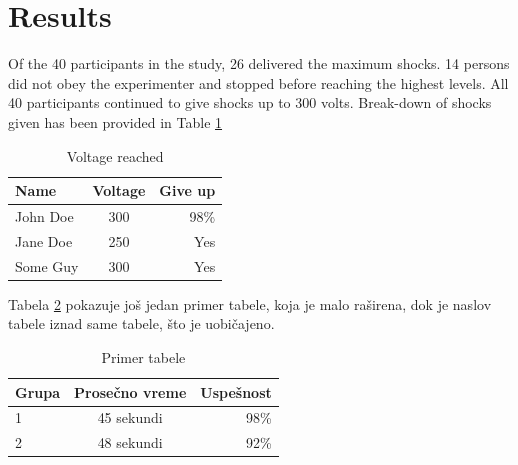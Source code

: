 \documentclass[conference]{IEEEtran}
\begin{document}
\section{Results}
\label{sec_results}

Of the 40 participants in the study, 26 delivered the maximum shocks. 14 persons 
did not obey the experimenter and stopped before reaching the highest levels. All 40 
participants continued to give shocks up to 300 volts. Break-down of shocks given
has been provided in Table \ref{tbl_voltages}

\begin{table}[h]
\centering
\begin{tabular}{ l | c | r }
  Name & Voltage & Give up \\
  \hline %
  John Doe & 300 & 98\% \\ %
  Jane Doe & 250 & Yes \\
  Some Guy & 300 & Yes\\
\end{tabular}
  \caption{Voltage reached}
  \label{tbl_voltages}
\end{table}

\lipsum [1-3] %

Tabela \ref{tabela2} pokazuje još jedan primer tabele, koja je malo raširena, dok je naslov tabele iznad same tabele, što je uobičajeno.

% 
\begin{table}[!hbtp]
\renewcommand{\arraystretch}{2.4}
\caption{Primer tabele}
\label{tabela2}
\centering
\begin{tabular}{l|||c|r} %
\hline
Grupa & Prosečno vreme & Uspešnost\\
\hline %
1 & 45 sekundi & 98\%\\ %
\hline
2 & 48 sekundi & 92\%\\ 
\hline
\end{tabular}
\end{table}
\end{document}
